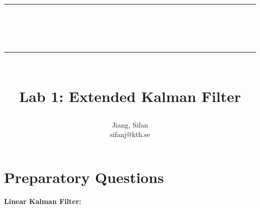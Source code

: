 \documentclass[11pt,a4paper]{article}
\begin{document}
\title{\sc\vspace{3cm}\hrule\vspace{0.3cm}{\LARGE EL2320}\\\vspace{0.1cm}{\Large Applied Estimation}\vspace{0.3cm}\hrule\vspace{1.5cm}{\Large Laboratory Report}\\{\large Lab 1: Extended Kalman Filter}}
\author{{\small Jiang, Sifan}\\{\small sifanj@kth.se}}
\maketitle
\newpage

\setcounter{cnt_questions}{0}
\section{Preparatory Questions}
\par \textbf{Linear Kalman Filter:}
\end{document}
